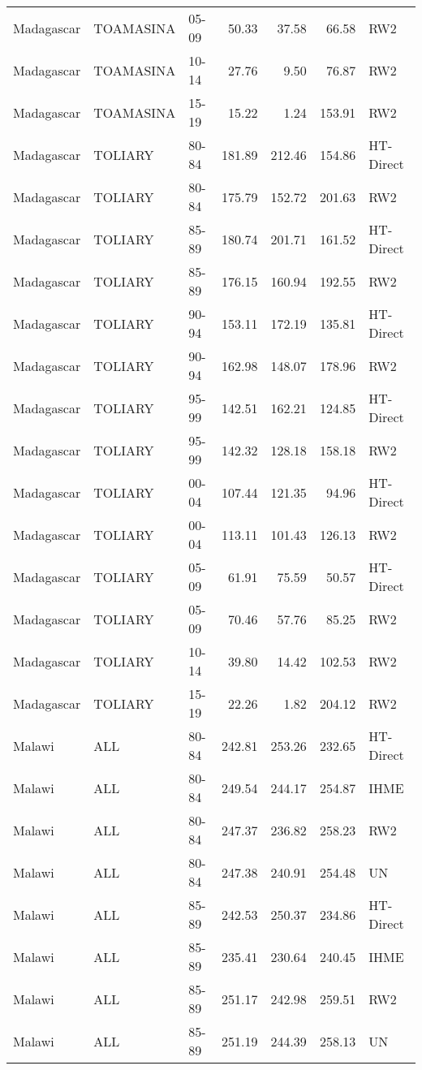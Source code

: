 \begin{longtable}{lllrrrl}
  Madagascar & TOAMASINA & 05-09 & 50.33 & 37.58 & 66.58 & RW2 \\ 
  Madagascar & TOAMASINA & 10-14 & 27.76 & 9.50 & 76.87 & RW2 \\ 
  Madagascar & TOAMASINA & 15-19 & 15.22 & 1.24 & 153.91 & RW2 \\ 
  Madagascar & TOLIARY & 80-84 & 181.89 & 212.46 & 154.86 & HT-Direct \\ 
  Madagascar & TOLIARY & 80-84 & 175.79 & 152.72 & 201.63 & RW2 \\ 
  Madagascar & TOLIARY & 85-89 & 180.74 & 201.71 & 161.52 & HT-Direct \\ 
  Madagascar & TOLIARY & 85-89 & 176.15 & 160.94 & 192.55 & RW2 \\ 
  Madagascar & TOLIARY & 90-94 & 153.11 & 172.19 & 135.81 & HT-Direct \\ 
  Madagascar & TOLIARY & 90-94 & 162.98 & 148.07 & 178.96 & RW2 \\ 
  Madagascar & TOLIARY & 95-99 & 142.51 & 162.21 & 124.85 & HT-Direct \\ 
  Madagascar & TOLIARY & 95-99 & 142.32 & 128.18 & 158.18 & RW2 \\ 
  Madagascar & TOLIARY & 00-04 & 107.44 & 121.35 & 94.96 & HT-Direct \\ 
  Madagascar & TOLIARY & 00-04 & 113.11 & 101.43 & 126.13 & RW2 \\ 
  Madagascar & TOLIARY & 05-09 & 61.91 & 75.59 & 50.57 & HT-Direct \\ 
  Madagascar & TOLIARY & 05-09 & 70.46 & 57.76 & 85.25 & RW2 \\ 
  Madagascar & TOLIARY & 10-14 & 39.80 & 14.42 & 102.53 & RW2 \\ 
  Madagascar & TOLIARY & 15-19 & 22.26 & 1.82 & 204.12 & RW2 \\ 
  Malawi & ALL & 80-84 & 242.81 & 253.26 & 232.65 & HT-Direct \\ 
  Malawi & ALL & 80-84 & 249.54 & 244.17 & 254.87 & IHME \\ 
  Malawi & ALL & 80-84 & 247.37 & 236.82 & 258.23 & RW2 \\ 
  Malawi & ALL & 80-84 & 247.38 & 240.91 & 254.48 & UN \\ 
  Malawi & ALL & 85-89 & 242.53 & 250.37 & 234.86 & HT-Direct \\ 
  Malawi & ALL & 85-89 & 235.41 & 230.64 & 240.45 & IHME \\ 
  Malawi & ALL & 85-89 & 251.17 & 242.98 & 259.51 & RW2 \\ 
  Malawi & ALL & 85-89 & 251.19 & 244.39 & 258.13 & UN \\ 

\end{longtable}
